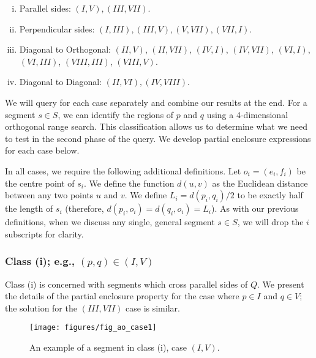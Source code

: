 \begin{enumerate}[i.]
\item Parallel sides: $(I, V), (III, VII)$.
\item Perpendicular sides: $(I, III), (III, V), (V,VII), (VII, I)$.
\item Diagonal to Orthogonal: $(II, V)$, $(II, VII)$, $(IV, I)$, $(IV, VII)$, $(VI, I)$, \newline $(VI, III)$, $(VIII, III)$, $(VIII, V)$.
\item Diagonal to Diagonal: $(II, VI), (IV, VIII)$.
\end{enumerate}

We will query for each case separately and combine our results at the end. 
For a segment $s \in S$, we can identify the regions of $p$ and $q$ using a 4-dimensional orthogonal range search. 
This classification allows us to determine what we need to test in the second phase of the query. 
We develop partial enclosure expressions for each case below.

In all cases, we require the following additional definitions. Let $o_i = (e_i, f_i)$ be the centre point of $s_i$.  We define the function $d(u,v)$ as the Euclidean distance between any two points $u$ and $v$. We define $L_i = d(p_i, q_i)/2$ to be exactly half the length of $s_i$ (therefore, $d(p_i, o_i) = d(q_i, o_i) = L_i$). As with our previous definitions, when we discuss any single, general segment $s \in S$, we will drop the $i$ subscripts for clarity.


\subsubsection{Class (i); e.g., $(p, q) \in (I, V)$}
\label{:rectangles:ao:class1}

Class (i) is concerned with segments which cross parallel sides of $Q$. 
We present the details of the partial enclosure property for the case where $p \in I$ and $q \in V$; the solution for the $(III, VII)$ case is similar.

\begin{figure}[t]
\begin{center}
  \texttt{[image: figures/fig\_ao\_case1]}
  \caption{An example of a segment in class (i), case $(I, V)$.}
  \label{fig:rectangles:ao:case1}
\end{center}
\end{figure}

